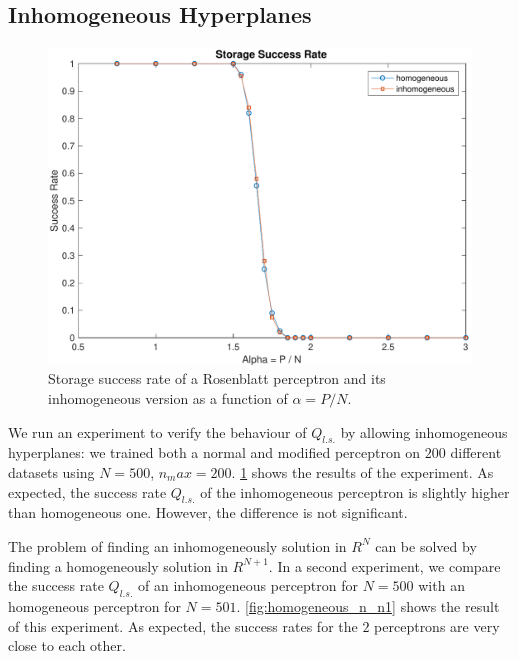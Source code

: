 \subsection{Inhomogeneous Hyperplanes}
\label{subsec:homogeneous}
\begin{figure}[t]
	\centering
	\includegraphics[width=\columnwidth]{figures/homogeneous}
    \caption{Storage success rate of a Rosenblatt perceptron and its inhomogeneous version as a function of $\alpha = P / N$.}
	\label{fig:homogeneous}
\end{figure}

We run an experiment to verify the behaviour of $Q_{l.s.}$ by allowing inhomogeneous hyperplanes:
we trained both a normal and modified perceptron on $200$ different datasets using $N = 500$, $n_max = 200$. 
\cref{fig:homogeneous} shows the results of the experiment.
As expected, the success rate $Q_{l.s.}$ of the inhomogeneous perceptron is slightly higher than homogeneous one.
However, the difference is not significant.

The problem of finding an inhomogeneously solution in $R^{N}$ can be solved by finding a homogeneously solution in $R^{N + 1}$.
In a second experiment, we compare the success rate $Q_{l.s.}$ of an inhomogeneous perceptron for $N = 500$ with an homogeneous perceptron for $N = 501$.
\cref{fig:homogeneous_n_n1} shows the result of this experiment.
As expected, the success rates for the $2$ perceptrons are very close to each other.

